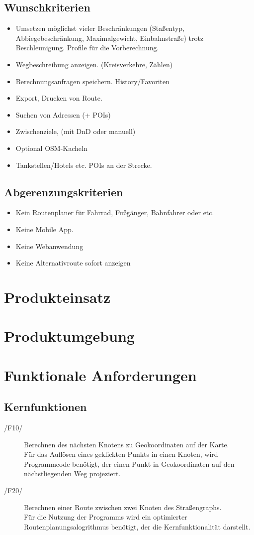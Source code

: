 \documentclass[a4paper, 11pt]{article}
\newcommand{\oitem}[1]{\item[/#1/\label{#1}]}
\begin{document}
\subsection{Wunschkriterien}
\begin{itemize}
\item Umsetzen möglichst vieler Beschränkungen (Staßentyp, Abbiegebeschränkung, 
Maximalgewicht, Einbahnstraße) trotz Beschleunigung. Profile für die Vorberechnung.

\item Wegbeschreibung anzeigen. (Kreisverkehre, Zählen)
\item Berechnungsanfragen speichern. History/Favoriten
\item Export, Drucken von Route.

\item Suchen von Adressen (+ POIs)

\item Zwischenziele, (mit DnD oder manuell)
\item Optional OSM-Kacheln
\item Tankstellen/Hotels etc. POIs an der Strecke.
\end{itemize}
\subsection{Abgerenzungskriterien}

\begin{itemize}
\item Kein Routenplaner für Fahrrad, Fußgänger, Bahnfahrer oder etc.
\item Keine Mobile App.
\item Keine Webanwendung
\item Keine Alternativroute sofort anzeigen

\end{itemize}

\section{Produkteinsatz}
\section{Produktumgebung}
\section{Funktionale Anforderungen}
\subsection{Kernfunktionen}
\begin{description}
\oitem{F10}
Berechnen des nächsten Knotens zu Geokoordinaten auf der Karte.\\
Für das Auflösen eines geklickten Punkts in einen Knoten, wird Programmcode benötigt, der einen Punkt in Geokoordinaten auf den nächstliegenden Weg projeziert.
\oitem{F20}
Berechnen einer Route zwischen zwei Knoten des Straßengraphs.\\
Für die Nutzung der Programms wird ein optimierter Routenplanungsalogrithmus benötigt, der die Kernfunktionalität darstellt.
\end{description}
\end{document}
